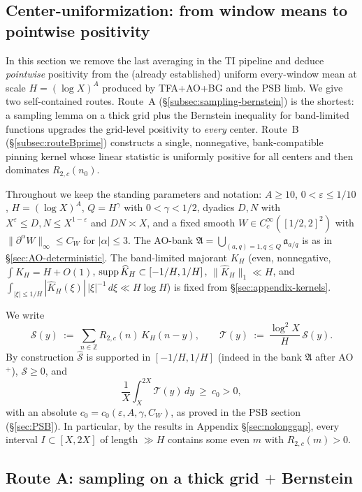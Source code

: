 \subsection{Center-uniformization: from window means to pointwise positivity}
\label{sec:CUNI}

In this section we remove the last averaging in the TI pipeline and deduce \emph{pointwise} positivity from the (already established) uniform every-window mean at scale $H=(\log X)^A$ produced by TFA+AO+BG and the PSB limb. We give two self-contained routes. Route~A (\S\ref{subsec:sampling-bernstein}) is the shortest: a sampling lemma on a thick grid plus the Bernstein inequality for band-limited functions upgrades the grid-level positivity to \emph{every} center. Route~B (\S\ref{subsec:routeBprime}) constructs a single, nonnegative, bank-compatible pinning kernel whose linear statistic is uniformly positive for all centers and then dominates $R_{2,c}(n_0)$.

Throughout we keep the standing parameters and notation: $A\ge 10$, $0<\varepsilon\le 1/10$, $H=(\log X)^A$, $Q=H^\gamma$ with $0<\gamma<1/2$, dyadics $D,N$ with $X^\varepsilon\le D,N\le X^{1-\varepsilon}$ and $DN\asymp X$, and a fixed smooth $W\in C_c^\infty([1/2,2]^2)$ with $\|\partial^\alpha W\|_\infty\le C_W$ for $|\alpha|\le 3$. The AO-bank $\mathfrak A=\bigcup_{(a,q)=1,q\le Q}\mathfrak a_{a/q}$ is as in \S\ref{sec:AO-deterministic}. The band-limited majorant $K_H$ (even, nonnegative, $\int K_H=H+O(1)$, $\operatorname{supp} \widehat K_H\subset[-1/H,1/H]$, $\|\widehat K_H\|_1\ll H$, and $\int_{|\xi|\le 1/H} |\widehat K_H(\xi)|\,|\xi|^{-1}\,d\xi\ll H\log H$) is fixed from \S\ref{sec:appendix-kernels}.

We write
\[
\mathcal S(y)\ :=\ \sum_{n\in\mathbb{Z}} R_{2,c}(n)\,K_H(n-y),
\qquad
\mathcal T(y)\ :=\ \frac{\log^2 X}{H}\,\mathcal S(y).
\]
By construction $\widehat{\mathcal S}$ is supported in $[-1/H,1/H]$ (indeed in the bank $\mathfrak A$ after AO$^+$), $\mathcal S\ge 0$, and
\begin{equation}\label{eq:PSB-mean}
\frac1X\int_X^{2X}\mathcal T(y)\,dy\ \ge\ c_0>0,
\end{equation}
with an absolute $c_0=c_0(\varepsilon,A,\gamma,C_W)$, as proved in the PSB section (\S\ref{sec:PSB}). In particular, by the results in Appendix \S\ref{sec:nolonggap}, every interval $I\subset[X,2X]$ of length $\gg H$ contains some even $m$ with $R_{2,c}(m)>0$.

\subsection{Route A: sampling on a thick grid \texorpdfstring{$+$}{+} Bernstein}

